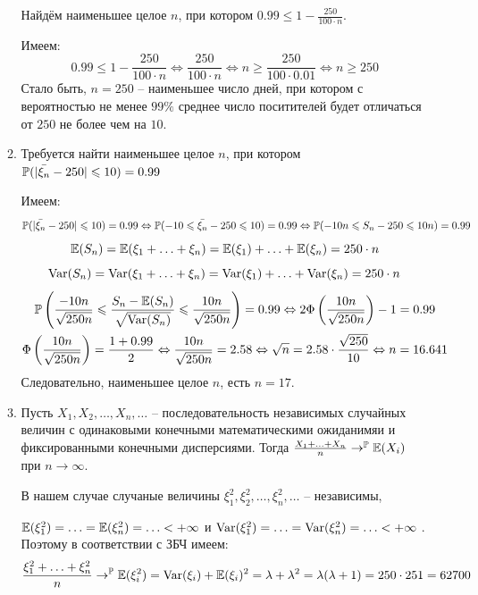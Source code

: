 \documentclass[12pt, a4paper]{article}\usepackage[]{graphicx}\usepackage[]{color}
\begin{document}
\begin{enumerate}
\begin{enumerate}
								Найдём наименьшее целое $n$, при котором $0.99 \leq 1 - \frac{250}{100\cdot n}$.

								Имеем:
								\[
								0.99 \leq 1 - \frac{250}{100\cdot n} \Leftrightarrow \frac{250}{100\cdot n} \Leftrightarrow n \geq \frac{250}{100 \cdot 0.01} \Leftrightarrow n  \geq 250
								\]
								Стало быть, $n=250$ – наименьшее число дней, при котором с вероятностью не менее $99\%$ среднее число поситителей будет отличаться от $250$ не более чем на $10$.
								\item  Требуется найти наименьшее целое $n$, при котором $\P(\vert\bar{\xi_n}-250\vert \leq 10)=0.99$

								Имеем:
								\[
								\P(\vert\bar{\xi_n}-250\vert \leq 10)=0.99 \Leftrightarrow \P(-10\leq \bar{\xi_n} -250 \leq 10) =0.99 \Leftrightarrow \P(-10n \leq S_n-250 \leq 10n) =0.99
								\]
								\[
								\E(S_n) = \E(\xi_1 + \ldots + \xi_n) = \E(\xi_1) + \ldots + \E(\xi_n) = 250\cdot n
								\]
								\[
								\Var(S_n) = \Var(\xi_1 + \ldots + \xi_n) = \Var(\xi_1) + \ldots + \Var(\xi_n) = 250 \cdot n
								\]
								\begin{multline*}
								\P\left(\frac{-10n}{\sqrt{250n}} \leq \frac{S_n - \E (S_n)}{\sqrt{\Var(S_n)}} \leq \frac{10n}{\sqrt{250n}}\right) =0.99 \Leftrightarrow 2 \Phi \left(\frac{10n}{\sqrt{250n}}\right) -1 = 0.99 \\
								\Phi \left(\frac{10n}{\sqrt{250n}}\right) = \frac{1 + 0.99}{2} \Leftrightarrow \frac{10n}{\sqrt{250n}} = 2.58 \Leftrightarrow \sqrt{n} = 2.58 \cdot \frac{\sqrt{250}}{10} \Leftrightarrow n = 16.641
								\end{multline*}
								Следовательно, наименьшее целое $n$, есть $n=17$.
								\item Пусть $X_1, X_2, \ldots, X_n, \ldots$ – последовательность независимых случайных величин с одинаковыми конечными математическими ожиданимяи и фиксированными конечными дисперсиями. Тогда $\frac{X_1 + \ldots + X_n}{n} \to^{\P} \E(X_i)$ при $n \to \infty$.

								В нашем случае случаные величины $\xi_1^2, \xi_2^2, \ldots, \xi_n^2, \ldots$ – независимы,

								 $\E(\xi_1^2) = \ldots = \E(\xi_n^2) = \ldots < + \infty$ и $\Var(\xi_1^2) = \ldots = \Var(\xi_n^2) = \ldots < + \infty$ . Поэтому в соответствии с ЗБЧ имеем:
								\[
								\frac{\xi_1^2 +\ldots+ \xi_n^2}{n} \to^{\P} \E(\xi_i^2) = \Var(\xi_i) +\E(\xi_i)^2 = \lambda + \lambda^2 = \lambda(\lambda+1) = 250\cdot251 = 62700
								\]
							\end{enumerate}


\end{enumerate}
\end{document}
